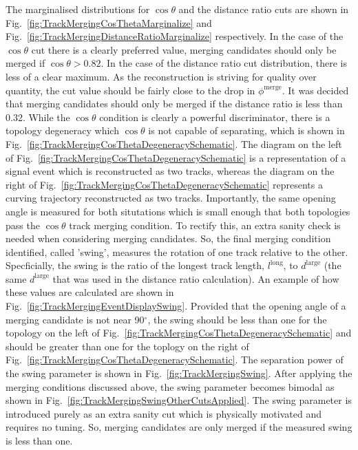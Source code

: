 The marginalised distributions for $\cos\theta$ and the distance ratio cuts are shown in Fig.~\ref{fig:TrackMergingCosThetaMarginalize} and Fig.~\ref{fig:TrackMergingDistanceRatioMarginalize} respectively.  In the case of the $\cos\theta$ cut there is a clearly preferred value, merging candidates should only be merged if $\cos\theta > 0.82$.  In the case of the distance ratio cut distribution, there is less of a clear maximum.  As the reconstruction is striving for quality over quantity, the cut value should be fairly close to the drop in $\phi^{\textrm{merge}}$.  It was decided that merging candidates should only be merged if the distance ratio is less than 0.32.
\newline
\newline
While the $\cos\theta$ condition is clearly a powerful discriminator, there is a topology degeneracy which $\cos\theta$ is not capable of separating, which is shown in Fig.~\ref{fig:TrackMergingCosThetaDegeneracySchematic}.  The diagram on the left of Fig.~\ref{fig:TrackMergingCosThetaDegeneracySchematic} is a representation of a signal event which is reconstructed as two tracks, whereas the diagram on the right of Fig.~\ref{fig:TrackMergingCosThetaDegeneracySchematic} represents a curving trajectory reconstructed as two tracks.  Importantly, the same opening angle is measured for both situtations which is small enough that both topologies pass the $\cos\theta$ track merging condition.  To rectify this, an extra sanity check is needed when considering merging candidates.  So, the final merging condition identified, called 'swing', measures the rotation of one track relative to the other.  Specficially, the swing is the ratio of the longest track length, $l^{\textrm{long}}$, to $d^{\textrm{large}}$ (the same $d^{\textrm{large}}$ that was used in the distance ratio calculation).  An example of how these values are calculated are shown in Fig.~\ref{fig:TrackMergingEventDisplaySwing}.  Provided that the opening angle of a merging candidate is not near 90$^\circ$, the swing should be less than one for the topology on the left of Fig.~\ref{fig:TrackMergingCosThetaDegeneracySchematic} and should be greater than one for the toplogy on the right of Fig.~\ref{fig:TrackMergingCosThetaDegeneracySchematic}.  The separation power of the swing parameter is shown in Fig.~\ref{fig:TrackMergingSwing}.  After applying the merging conditions discussed above, the swing parameter becomes bimodal as shown in Fig.~\ref{fig:TrackMergingSwingOtherCutsApplied}.  The swing parameter is introduced purely as an extra sanity cut which is physically motivated and requires no tuning.  So, merging candidates are only merged if the measured swing is less than one.
